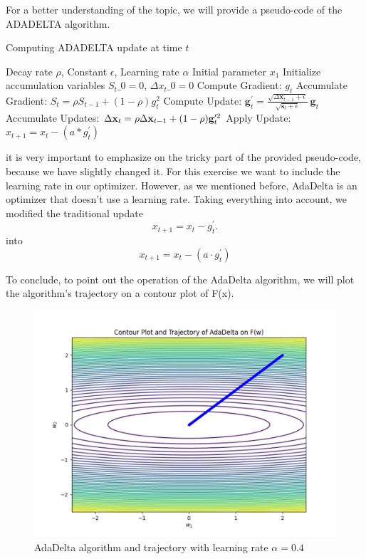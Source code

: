 For a better understanding of the topic, we will provide a pseudo-code of the ADADELTA algorithm.
	\begin{algorithm}[H]
		\caption{Computing ADADELTA update at time $t$}
		\begin{algorithmic}
			\Require Decay rate $\rho$, Constant $\epsilon$, Learning rate $\alpha$
			\Require Initial parameter $x_1$
			\State Initialize accumulation variables $S_t\_0 = 0$, $\Delta x_t\_0 = 0$
			\State Compute Gradient: $g_t$
			\State Accumulate Gradient: $S_t = \rho S_{t-1} + (1 - \rho)g_t^2$
			\State Compute Update: $	\mathbf{g}_{t}^{\prime}={\frac{\sqrt{\Delta\mathbf{x}_{t-1}+\epsilon}}{\sqrt{\mathbf{s}_{t}+\epsilon}}}~\mathbf{g}_{t}$
			\State Accumulate Updates: 	$\Delta{\bf x}_{t}=\rho\Delta{\bf x}_{t-1}+(1-\rho){\bf g}_{t}^{\prime2}$
			\State Apply Update: $x_{t+1} = x_t - (a*g_{t}^{\prime})$
			\EndFor
		\end{algorithmic}
	\end{algorithm}
it is very important to emphasize on the tricky part of the provided pseudo-code, because we have slightly changed it. For this exercise we want to include the learning rate in our optimizer. However, as we mentioned before, AdaDelta is an optimizer that doesn't use a learning rate. Taking everything into account, we modified the traditional update
\begin{equation}
	{x}_{t+1}={x}_{t}-{g}_{t}^{\prime}.
\end{equation}
into
\begin{equation}
	x_{t+1} = x_t - (a \cdot g_{t}^{\prime})
\end{equation}

To conclude, to point out the operation of the AdaDelta algorithm, we will plot the algorithm’s trajectory on a contour plot of F(x).
\begin{figure}[H]
	\centering
	\includegraphics[width=.7\textwidth]{../Problem 8/ADADELTA_04.pdf}
	\caption{AdaDelta algorithm and trajectory with learning rate $\alpha=0.4$}
	\label{fig:lr=0.4}
\end{figure}
\vspace{2mm}


